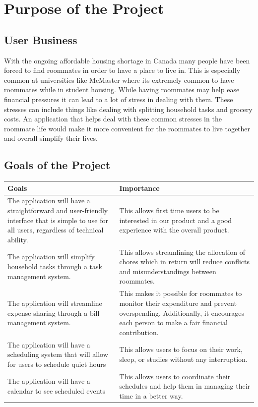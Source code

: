\documentclass[12pt]{article}
\begin{document}
\section{Purpose of the Project}
\subsection{User Business}

With the ongoing affordable housing shortage in Canada many people have been forced to find roommates in order to have a place to live in. This is especially common at universities like McMaster where its extremely common to have roommates while in student housing. While having roommates may help ease financial pressures it can lead to a lot of stress in dealing with them. These stresses can include things like dealing with splitting household tasks and grocery costs. An application that helps deal with these common stresses in the roommate life would make it more convenient  for the roommates to live together and overall simplify their lives.

\subsection{Goals of the Project}

\begin{center}
\begin{tabular}{|p{6cm}|p{6cm}|}
\hline
\textbf{Goals} & \textbf{Importance}\\
\hline The application will have a straightforward and user-friendly interface that is simple to use for all users, regardless of technical ability. & This allows first time users to be interested in our product and a good experience with the overall product. \\
\hline
The application will simplify household tasks through a task management system. & This allows streamlining the allocation of chores which in return will reduce conflicts and misunderstandings between roommates. \\
\hline
The application will streamline expense sharing through a bill management system. & This makes it possible for roommates to monitor their expenditure and prevent overspending. Additionally, it encourages each person to make a fair financial contribution. \\
\hline
The application will have a scheduling system that will allow for users to schedule quiet hours & This allows users to focus on their work, sleep, or studies without any interruption. \\
\hline
The application will have a calendar to see scheduled events & This allows users to coordinate their schedules and help them in managing their time in a better way. \\
\hline
\end{tabular}
\end{center}
\end{document}
